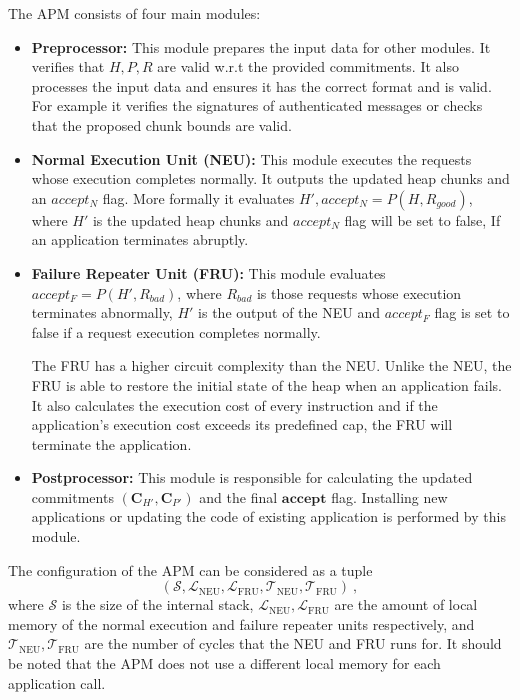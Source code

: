 The APM consists of four main modules:
\begin{itemize}
    \item \textbf{Preprocessor:} This module prepares the input data for other modules. It verifies that $H,
    P,R$ are valid w.r.t the provided commitments. It also processes the input data and ensures it has the
    correct format and is valid. For example it verifies the signatures of authenticated messages or
    checks that the proposed chunk bounds are valid.
    \item \textbf{Normal Execution Unit (NEU):} This module executes the requests whose execution completes
    normally. It outputs the updated heap chunks and an $accept_N$ flag. More formally it evaluates
    $H',accept_N=P(H,R_{good})$, where $H'$ is the updated heap chunks and $accept_N$ flag will be set to false, If an
    application terminates abruptly.
    \item \textbf{Failure Repeater Unit (FRU):} This module evaluates $accept_F=P(H',R_{bad})$, where $R_{bad}$ is
    those requests whose execution terminates abnormally, $H'$ is the output of the NEU and $accept_F$ flag is set
    to false if a request execution completes normally.

    The FRU has a higher circuit complexity than the NEU\@. Unlike the NEU, the FRU is able to restore the initial state
    of the heap when an application fails. It also calculates the execution cost of every instruction and if the
    application's execution cost exceeds its predefined cap, the FRU will terminate the application.
    \item \textbf{Postprocessor:} This module is responsible for calculating the updated commitments
    $(\mathbf{C}_{H'}, \mathbf{C}_{P'})$ and the final $\mathbf{accept}$ flag. Installing new applications or
    updating the code of existing application is performed by this module.
\end{itemize}


The configuration of the APM can be considered as a tuple
\[
(\mathcal{S},\mathcal{L}_{\text{NEU}},\mathcal{L}_{\text{FRU}},\mathcal{T}_{\text{NEU}},
\mathcal{T}_{\text{FRU}})\ ,
\]
where $\mathcal{S}$ is the size of the internal stack, $\mathcal{L}_{\text{NEU}},\mathcal{L}_{\text{FRU}}$ are the
amount of local memory of the normal execution and failure repeater units respectively, and
$\mathcal{T}_{\text{NEU}},\mathcal{T}_{\text{FRU}}$ are the number of cycles that the NEU and FRU runs for. It should
be noted that the APM does not use a different local memory for each application call.

%
